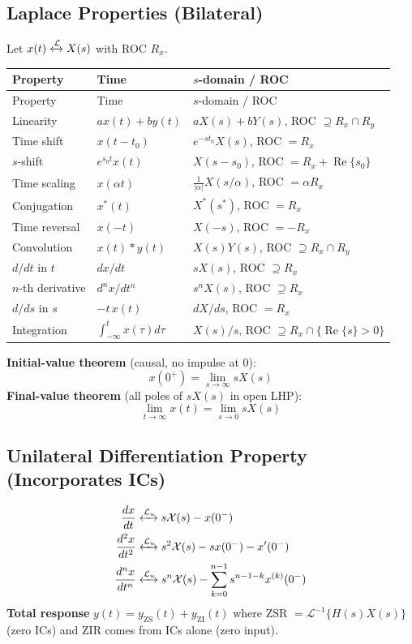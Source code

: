 \documentclass[10pt]{article}
\newcommand{\Lap}{\ensuremath{\mathcal{L}}}
\newcommand{\Real}{\operatorname{Re}}
\newcommand{\ltrans}{\xleftrightarrow{\mathcal{L}}}
\begin{document}
\subsection{Laplace Properties (Bilateral)}
Let $x(t)\ltrans X(s)$ with ROC $R_x$.
\begin{longtable}{@{}lll@{}}
\toprule Property & Time & $s$-domain / ROC \\ \midrule \endfirsthead
\toprule Property & Time & $s$-domain / ROC \\ \midrule \endhead
\bottomrule \endfoot
Linearity & $ax(t) + by(t)$ & $aX(s) + bY(s)$, ROC $\supseteq R_x \cap R_y$ \\
Time shift & $x(t - t_0)$ & $e^{-st_0}X(s)$, ROC $= R_x$ \\
$s$-shift & $e^{s_0 t}x(t)$ & $X(s - s_0)$, ROC $= R_x + \Real\{s_0\}$ \\
Time scaling & $x(\alpha t)$ & $\tfrac{1}{|\alpha|}X(s/\alpha)$, ROC $= \alpha R_x$ \\
Conjugation & $x^*(t)$ & $X^*(s^*)$, ROC $= R_x$ \\
Time reversal & $x(-t)$ & $X(-s)$, ROC $= -R_x$ \\
Convolution & $x(t) * y(t)$ & $X(s)Y(s)$, ROC $\supseteq R_x \cap R_y$ \\
$d/dt$ in $t$ & $dx/dt$ & $sX(s)$, ROC $\supseteq R_x$ \\
$n$-th derivative & $d^n x/dt^n$ & $s^n X(s)$, ROC $\supseteq R_x$ \\
$d/ds$ in $s$ & $-t\,x(t)$ & $dX/ds$, ROC $= R_x$ \\
Integration & $\int_{-\infty}^t x(\tau)d\tau$ & $X(s)/s$, ROC $\supseteq R_x \cap \{\Real\{s\}>0\}$ \\
\end{longtable}

\textbf{Initial-value theorem} (causal, no impulse at $0$):
\[
x(0^+) = \lim_{s\to\infty} sX(s)
\]
\textbf{Final-value theorem} (all poles of $sX(s)$ in open LHP):
\[
\lim_{t\to\infty} x(t) = \lim_{s\to 0} sX(s)
\]

\subsection{Unilateral Differentiation Property (Incorporates ICs)}
\begin{align*}
\frac{dx}{dt} &\xleftrightarrow{\Lap_u} s\mathcal{X}(s) - x(0^-) \\
\frac{d^2 x}{dt^2} &\xleftrightarrow{\Lap_u} s^2\mathcal{X}(s) - s x(0^-) - x'(0^-) \\
\frac{d^n x}{dt^n} &\xleftrightarrow{\Lap_u} s^n\mathcal{X}(s) - \sum_{k=0}^{n-1} s^{n-1-k} x^{(k)}(0^-)
\end{align*}
\textbf{Total response} $y(t) = y_{\text{ZS}}(t) + y_{\text{ZI}}(t)$ where ZSR $= \Lap^{-1}\{H(s)X(s)\}$ (zero ICs) and ZIR comes from ICs alone (zero input).
\end{document}
